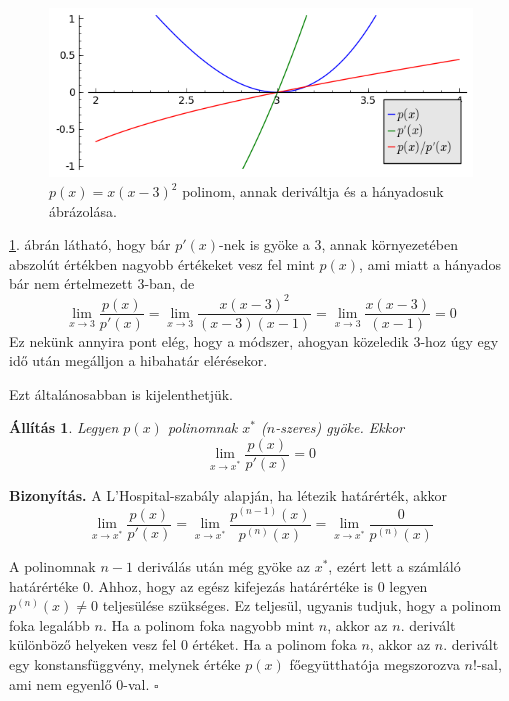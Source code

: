 \documentclass[a4paper,12pt]{report}
\newtheorem{All}[Tet]{Állítás}
\newenvironment{Biz}{\noindent \textbf{Bizonyítás. }}{ $\square$}
\begin{document}
				\begin{figure}[ht]
					\centering
					\includegraphics[scale=0.7]{multi.png}
					\caption{$p(x)=x(x-3)^2$ polinom, annak deriváltja és a hányadosuk ábrázolása.}\label{img:multiple}
				\end{figure}

			
			\ref{img:multiple}. ábrán látható, hogy bár $p'(x)$-nek is gyöke a $3$, annak környezetében abszolút értékben nagyobb értékeket vesz fel mint $p(x)$, ami miatt a hányados bár nem értelmezett $3$-ban, de \[\lim_{x\to3}\frac{p(x)}{p'(x)}=\lim_{x\to3}\frac{x(x-3)^2}{(x-3)(x-1)}=\lim_{x\to3}\frac{x(x-3)}{(x-1)}=0\]
				Ez nekünk annyira pont elég, hogy a módszer, ahogyan közeledik $3$-hoz úgy egy idő után megálljon a hibahatár elérésekor.
                
                               Ezt általánosabban is kijelenthetjük. \begin{All}\label{tartnullahoz}Legyen $p(x)$ polinomnak $x^*$ ($n$-szeres) gyöke. Ekkor 
                \[\lim_{x\to x^*}\frac{p(x)}{p'(x)}=0\]
                \end{All}
                \begin{Biz}
                A L'Hospital-szabály alapján, ha létezik határérték, akkor
                \[\lim_{x\to x^*}\frac{p(x)}{p'(x)}=\lim_{x \to x^*}\frac{p^{(n-1)}(x)}{p^{(n)}(x)}=\lim_{x \to x^*}\frac{0}{p^{(n)}(x)}\]

				A polinomnak $n-1$ deriválás után még gyöke az $x^*$, ezért lett a számláló határértéke $0$. Ahhoz, hogy az egész kifejezás határértéke is $0$ legyen $p^{(n)}(x)\neq 0$ teljesülése szükséges. Ez teljesül, ugyanis tudjuk, hogy a polinom foka legalább $n$. Ha a polinom foka nagyobb mint $n$, akkor az $n.$ derivált különböző helyeken vesz fel 0 értéket. Ha a polinom foka $n$, akkor az $n.$ derivált egy konstansfüggvény, melynek értéke $p(x)$ főegyütthatója megszorozva $n!$-sal, ami nem egyenlő 0-val.
                \end{Biz}
                
\end{document}
